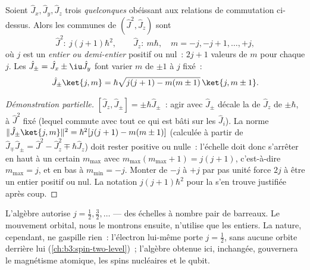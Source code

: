 \begin{theorem}\label{thm:b3:quantum-angular-momentum:spectrum}
Soient $\hat J_x, \hat J_y, \hat J_z$ trois 
\emph{quelconques} obéissant aux relations de commutation ci-dessus.
Alors les  communes de $(\hat J^2, \hat J_z)$ sont
\[
\hat J^2:\ j(j+1)\hbar^2 , \qquad
\hat J_z:\ m\hbar , \quad m = -j, -j+1, \dots, +j ,
\]
où $j$ est un \emph{entier ou demi-entier} positif ou nul~: $2j + 1$
valeurs de $m$ pour chaque $j$. Les  $\hat J_\pm = \hat
J_x \pm \iu\hat J_y$ font varier $m$ de $\pm1$ à $j$ fixé~:
\[
\hat J_\pm\ket{j,m} = \hbar\sqrt{j(j+1) - m(m\pm1)}\,\ket{j,m\pm1} .
\]
\end{theorem}

\begin{proof}[Démonstration partielle]
$[\hat J_z, \hat J_\pm] = \pm\hbar\hat J_\pm$~: agir avec $\hat
J_\pm$ décale la  de $\hat J_z$ de $\pm\hbar$, à
$\hat J^2$ fixé (lequel commute avec tout ce qui est bâti sur les $\hat
J_i$). La norme $\|\hat J_\pm\ket{j,m}\|^2 = \hbar^2[j(j+1) -
m(m\pm1)]$ (calculée à partir de $\hat J_\mp\hat J_\pm = \hat J^2 - \hat
J_z^2 \mp \hbar\hat J_z$) doit rester positive ou nulle~: l'échelle
doit donc s'arrêter en haut à un certain $m_{\max}$ avec $m_{\max}(m_{\max}+1) =
j(j+1)$, c'est-à-dire $m_{\max} = j$, et en bas à $m_{\min} = -j$.
Monter de $-j$ à $+j$ par pas unité force $2j$ à être un entier
positif ou nul. La notation $j(j+1)\hbar^2$ pour la  s'en
trouve justifiée après coup.
\end{proof}

\begin{remark}\label{rem:b3:quantum-angular-momentum:halfinteger}
L'algèbre autorise $j = \tfrac12, \tfrac32, \dots$ --- des échelles à
nombre pair de barreaux. Le mouvement orbital, nous le montrons
ensuite, n'utilise que les entiers. La nature, cependant, ne gaspille
rien~: l'électron lui-même porte $j = \tfrac12$, sans aucune orbite
derrière lui (\cref{ch:b3:spin-two-level})~; l'algèbre obtenue ici,
inchangée, gouvernera le magnétisme atomique, les spins nucléaires et
le qubit.
\end{remark}

